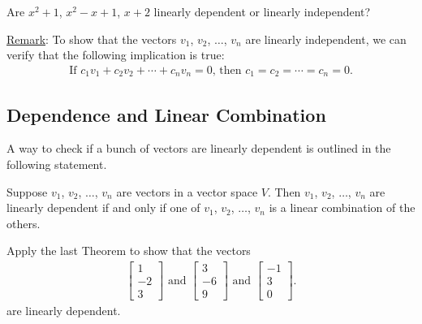 \documentclass[12pt,a4paper]{article}
\newcounter{example}[section]
\begin{document}
	\newpage
	
	\begin{example}
	Are $x^2 + 1$, $x^2 - x + 1$, $x + 2$ linearly dependent or linearly independent?
	\end{example}
	
	\vfill
	
	\underline{Remark}: To show that the vectors $v_1$, $v_2$, $\ldots$, $v_n$ are linearly independent, we can verify that the following implication is true:
		\begin{align*}
		\text{If } c_1 v_1 + c_2 v_2 + \cdots + c_n v_n = 0 \text{, then } c_1 = c_2 = \cdots = c_n = 0 .
		\end{align*}
	\newpage
	
	\subsection{Dependence and Linear Combination}
	
	A way to check if a bunch of vectors are linearly dependent is outlined in the following statement.
	
	\vspace*{18pt}
	
	\begin{theorem}
	Suppose $v_1$, $v_2$, $\ldots$, $v_n$ are vectors in a vector space $V$. Then $v_1$, $v_2$, $\ldots$, $v_n$ are linearly dependent if and only if one of $v_1$, $v_2$, $\ldots$, $v_n$ is a linear combination of the others.
	\end{theorem}
	
	\vspace*{18pt}
	
	\begin{example}
	Apply the last Theorem to show that the vectors
		\begin{align*}
		\begin{bmatrix}
		1 \\ -2 \\ 3
		\end{bmatrix}
		\text{ and }
		\begin{bmatrix}
		3 \\ -6 \\ 9
		\end{bmatrix}
		\text{ and }
		\begin{bmatrix}
		-1 \\ 3 \\ 0
		\end{bmatrix} .
		\end{align*}
	are linearly dependent.
	\end{example}
	
\end{document}
